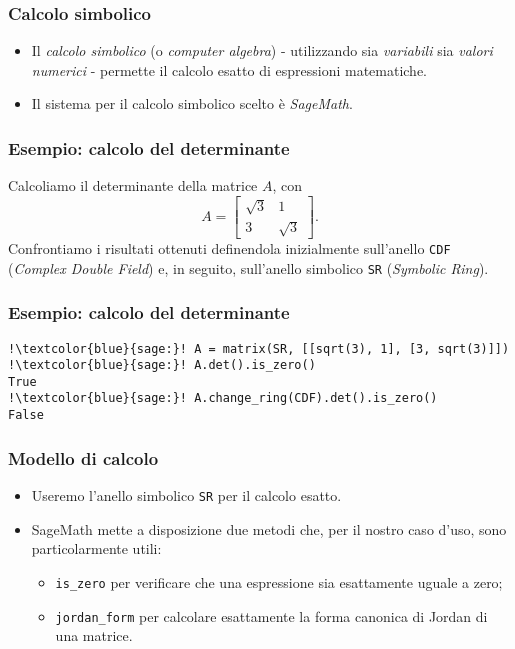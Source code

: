 \begin{frame}
	\frametitle{Calcolo simbolico}
	\begin{itemize}
		\item Il \emph{calcolo simbolico} (o \emph{computer algebra}) - utilizzando sia
		\emph{variabili} sia \emph{valori numerici} - permette il calcolo esatto di
		espressioni matematiche.

		\item {} Il sistema per il calcolo simbolico scelto \`e \emph{SageMath}.
	\end{itemize}
\end{frame}

\begin{frame}
	\frametitle{Esempio: calcolo del determinante}
	Calcoliamo il determinante della matrice $A$, con
	\[
		A = \begin{bmatrix}
			\sqrt{3} & 1 \\
			3 & \sqrt{3}
		\end{bmatrix}.
	\]
	Confrontiamo i risultati ottenuti definendola
	inizialmente sull'anello \texttt{CDF} (\emph{Complex Double Field})
	e, in seguito, sull'anello simbolico \texttt{SR} (\emph{Symbolic Ring}).
\end{frame}

\begin{frame}[fragile]
	\frametitle{Esempio: calcolo del determinante}
		\begin{verbatim}
!\textcolor{blue}{sage:}! A = matrix(SR, [[sqrt(3), 1], [3, sqrt(3)]])
!\textcolor{blue}{sage:}! A.det().is_zero()
True
!\textcolor{blue}{sage:}! A.change_ring(CDF).det().is_zero()
False
		\end{verbatim}
\end{frame}

\begin{frame}
	\frametitle{Modello di calcolo}
	\begin{itemize}
		\item Useremo l'anello simbolico \texttt{SR} per il calcolo esatto.
		\item {} SageMath mette a disposizione due metodi che, per il nostro caso
		d'uso, sono particolarmente utili:
		\begin{itemize}
			\item {} \texttt{is_zero}
			per verificare che una espressione sia esattamente uguale a zero;
			\item {} \texttt{jordan_form}
			per calcolare esattamente la forma canonica di Jordan di una matrice.
		\end{itemize}
	\end{itemize}
\end{frame}
